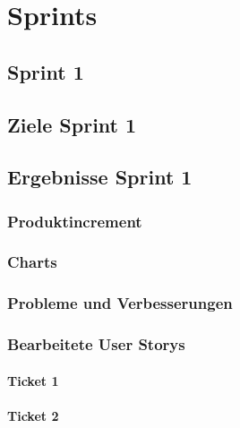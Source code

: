 
\chapter{Sprints}

\section{Sprint 1}

\section{Ziele Sprint 1}

\section{Ergebnisse Sprint 1}

\subsection{Produktincrement}
\subsection{Charts}

\subsection{Probleme und Verbesserungen}


\subsection{Bearbeitete User Storys}

\subsubsection{Ticket 1}

\subsubsection{Ticket 2}

